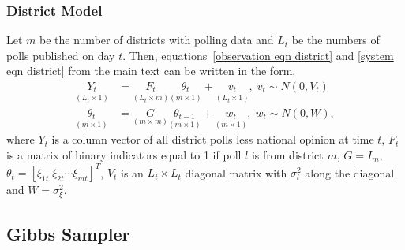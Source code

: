 \documentclass[12pt,final,fleqn]{article}
\theoremstyle{plain}
\begin{document}
\subsubsection{District Model} 
Let $m$ be the number of districts with polling data and $L_t$ be the numbers of polls published on day $t$. Then, equations~\ref{observation eqn district} and \ref{system eqn district} from the main text can be written in the form,
\begin{align}
\label{eqn: dlm observation}
\underset{(L_t \times 1)}{Y_t} &= \underset{(L_t \times m)}{F_t} \underset{(m \times 1)}{\theta_t} + \underset{(L_t \times 1)}{v_t},\; v_t \sim N(0, V_t)\\
\label{eqn: dlm state}
\underset{(m \times 1)}{\theta_t} &= \underset{(m \times m)}{G}\underset{(m \times 1)}{\theta_{t-1}} + \underset{(m \times 1)}{w_t},\; w_t \sim N(0, W),
\end{align}
where $Y_t$ is a column vector of all district polls less national opinion at time $t$, $F_t$ is a matrix of binary indicators equal to 1 if poll $l$ is from district $m$, $G= I_m$, $\theta_t = [\xi_{1t}\; \xi_{2t}\cdots \xi_{mt}]^T$, $V_t$ is an $L_t \times L_t$ diagonal matrix with $\sigma^2_l$ along the diagonal and $W = \sigma^2_\xi$.

\subsection{Gibbs Sampler}
\end{document}
